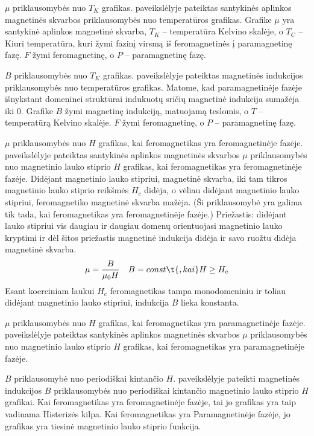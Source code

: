 {$\mu$ priklausomybės nuo $T_{K}$ grafikas.}
 paveikslėlyje pateiktas santykinės aplinkos
magnetinės skvarbos priklausomybės nuo temperatūros grafikas.
Grafike $\mu$ yra santykinė aplinkos magnetinė skvarba, $T_{K}$ –
temperatūra Kelvino skalėje, o $T_{C}$ – Kiuri temperatūra, kuri
žymi fazinį virsmą iš feromagnetinės į paramagnetinę fazę. $F$ žymi
feromagnetinę, o $P$ – paramagnetinę fazę.

{$B$ priklausomybės nuo $T_{K}$ grafikas.}
 paveikslėlyje pateiktas magnetinės indukcijos
priklausomybės nuo temperatūros grafikas. Matome, kad
paramagnetinėje fazėje išnykstant domeninei struktūrai indukuotų
sričių magnetinė indukcija sumažėja iki 0. Grafike $B$ žymi magnetinę
indukciją, matuojamą teslomis, o $T$ – temperatūrą Kelvino skalėje.
$F$ žymi feromagnetinę, o $P$ – paramagnetinę fazę.

{$\mu$ priklausomybės nuo $H$ grafikas, kai
feromagnetikas yra feromagnetinėje fazėje.}
 paveikslėlyje pateiktas santykinės aplinkos
magnetinės skvarbos $\mu$ priklausomybės nuo magnetinio lauko stiprio
$H$ grafikas, kai feromagnetikas yra feromagnetinėje fazėje. Didėjant
magnetinio lauko stipriui, magnetinė skvarba, iki tam tikros magnetinio
lauko stiprio reikšmės $H_{c}$ didėja, o vėliau didėjant magnetinio
lauko stipriui, feromagnetiko magnetinė skvarba mažėja. (Ši
priklausomybė yra galima tik tada, kai feromagnetikas yra
feromagnetinėje fazėje.) Priežastis: didėjant lauko stipriui vis
daugiau ir daugiau domenų orientuojasi magnetinio lauko kryptimi ir
dėl šitos priežastis magnetinė indukcija didėja ir savo ruožtu
didėja magnetinė skvarba.
\begin{align*}
  \mu &= \frac{B}{\mu_{0}H} & B = const\t{, kai} H \geq H_{c} \\
\end{align*}
Esant koerciniam laukui $H_{c}$ feromagnetikas tampa monodomeniniu ir
toliau didėjant magnetinio lauko stipriui, indukcija $B$ lieka konstanta.

{$\mu$ priklausomybės nuo $H$ grafikas, kai
feromagnetikas yra paramagnetinėje fazėje.}
 paveikslėlyje pateiktas santykinės aplinkos
magnetinės skvarbos $\mu$ priklausomybės nuo magnetinio lauko
stiprio $H$ grafikas, kai feromagnetikas yra paramagnetinėje
fazėje.

{$B$ priklausomybė nuo periodiškai kintančio $H$.}
 paveikslėlyje pateikti magnetinės indukcijos $B$
priklausomybės nuo periodiškai kintančio magnetinio lauko stiprio $H$
grafikai. Kai feromagnetikas yra feromagnetinėje fazėje, tai
jo grafikas yra taip vadinama Histerizės kilpa. Kai feromagnetikas
yra Paramagnetinėje fazėje, jo grafikas yra tiesinė magnetinio
lauko stiprio funkcija.

